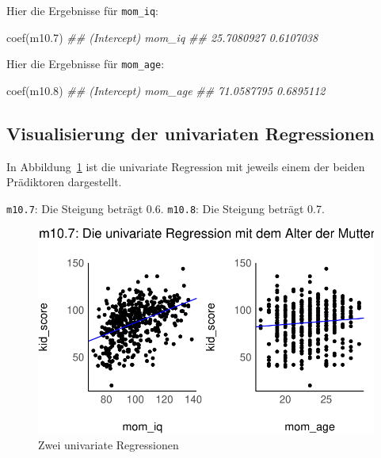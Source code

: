 \documentclass[
  a4paper,
  DIV=11]{scrreprt}
\newenvironment{Shaded}{\begin{snugshade}}{\end{snugshade}}
\newcommand{\DocumentationTok}[1]{\textcolor[rgb]{0.37,0.37,0.37}{\textit{#1}}}
\newcommand{\FloatTok}[1]{\textcolor[rgb]{0.68,0.00,0.00}{#1}}
\newcommand{\FunctionTok}[1]{\textcolor[rgb]{0.28,0.35,0.67}{#1}}
\newcommand{\NormalTok}[1]{\textcolor[rgb]{0.00,0.23,0.31}{#1}}
\theoremstyle{definition}
\theoremstyle{remark}
\begin{document}
Hier die Ergebnisse für \texttt{mom\_iq}:

\begin{Shaded}
\begin{Highlighting}[]
\FunctionTok{coef}\NormalTok{(m10}\FloatTok{.7}\NormalTok{)}
\DocumentationTok{\#\# (Intercept)      mom\_iq }
\DocumentationTok{\#\#  25.7080927   0.6107038}
\end{Highlighting}
\end{Shaded}

Hier die Ergebnisse für \texttt{mom\_age}:

\begin{Shaded}
\begin{Highlighting}[]
\FunctionTok{coef}\NormalTok{(m10}\FloatTok{.8}\NormalTok{)}
\DocumentationTok{\#\# (Intercept)     mom\_age }
\DocumentationTok{\#\#  71.0587795   0.6895112}
\end{Highlighting}
\end{Shaded}

\hypertarget{visualisierung-der-univariaten-regressionen}{%
\subsection{Visualisierung der univariaten
Regressionen}\label{visualisierung-der-univariaten-regressionen}}

In Abbildung~\ref{fig-regr-one-pred} ist die univariate Regression mit
jeweils einem der beiden Prädiktoren dargestellt.

\texttt{m10.7}: Die Steigung beträgt 0.6. \texttt{m10.8}: Die Steigung
beträgt 0.7.

\begin{figure}

{\centering \includegraphics{./metrische-AV_files/figure-pdf/fig-regr-one-pred-1.pdf}

}

\caption{\label{fig-regr-one-pred}Zwei univariate Regressionen}

\end{figure}
\end{document}
